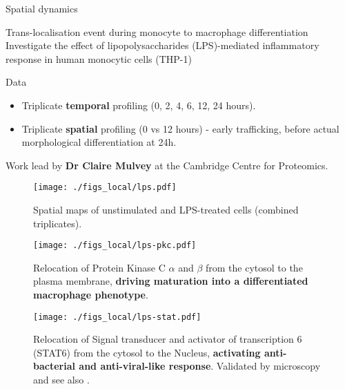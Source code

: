 \begin{frame}{Spatial dynamics}
  \begin{block}{Trans-localisation event during monocyte to macrophage
      differentiation}
    Investigate the effect of lipopolysaccharides (LPS)-mediated
    inflammatory response in human monocytic cells (THP-1)
  \end{block}

  \begin{block}{Data}
    \begin{itemize}
    \item Triplicate \textbf{temporal} profiling (0, 2, 4, 6, 12, 24
      hours).
    \item Triplicate \textbf{spatial} profiling (0 vs 12 hours) -
      early trafficking, before actual morphological differentiation
      at 24h.
    \end{itemize}
  \end{block}

  Work lead by \textbf{Dr Claire Mulvey} at the Cambridge Centre for
  Proteomics.

\end{frame}



\begin{frame}
  \begin{figure}[h]
    \centering
    \texttt{[image: ./figs\_local/lps.pdf]}
    \caption{Spatial maps of unstimulated and LPS-treated cells
      (combined triplicates).}
  \end{figure}
\end{frame}

\begin{frame}
  \begin{figure}[h]
    \centering
    \texttt{[image: ./figs\_local/lps-pkc.pdf]}
    \caption{Relocation of Protein Kinase C $\alpha$ and $\beta$ from the
      cytosol to the plasma membrane, \textbf{driving maturation into
        a differentiated macrophage phenotype}.}
  \end{figure}
\end{frame}

\begin{frame}
  \begin{figure}[h]
    \centering
    \texttt{[image: ./figs\_local/lps-stat.pdf]}
    \caption{Relocation of Signal transducer and activator of
      transcription 6 (STAT6) from the cytosol to the Nucleus,
      \textbf{activating anti-bacterial and anti-viral-like
        response}. Validated by microscopy and see also
      \cite{Chen:2011}.}
  \end{figure}
\end{frame}
